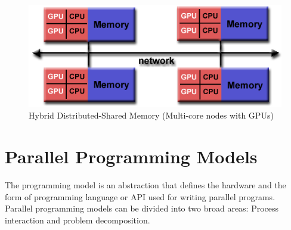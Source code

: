 \begin{figure}[ht]
  \centering
  \includegraphics[scale=0.6]{images/hybrid_mem2.png}
  \caption{Hybrid Distributed-Shared Memory (Multi-core nodes with GPUs)}
  \label{fig:hybridd_mem2}
\end{figure}


\section{Parallel Programming Models}
The programming model is an abstraction that defines the hardware and the form of programming language or API used for writing parallel programs.
Parallel programming models can be divided into two broad areas: Process interaction and problem decomposition.~\cite{parallelprogrammingmodels}
